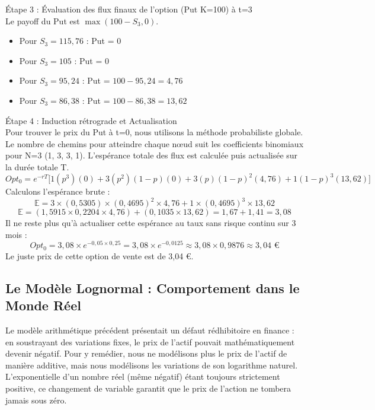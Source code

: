 \begin{examplebox}
Étape 3 : Évaluation des flux finaux de l'option (Put K=100) à t=3\\
Le payoff du Put est $\max(100 - S_3, 0)$.
\begin{itemize}[label=$\cdot$]
    \item Pour $S_3 = 115,76$ : Put = 0
    \item Pour $S_3 = 105$ : Put = 0
    \item Pour $S_3 = 95,24$ : Put = $100 - 95,24 = 4,76$
    \item Pour $S_3 = 86,38$ : Put = $100 - 86,38 = 13,62$
\end{itemize}

Étape 4 : Induction rétrograde et Actualisation\\
Pour trouver le prix du Put à t=0, nous utilisons la méthode probabiliste globale. Le nombre de chemins pour atteindre chaque nœud suit les coefficients binomiaux pour N=3 (1, 3, 3, 1). L'espérance totale des flux est calculée puis actualisée sur la durée totale T.
\begin{equation}
    \label{eq:fsec3-ex_opt_calc}
    Opt_0 = e^{-rT} \Big[ 1(p^3)(0) + 3(p^2)(1-p)(0) + 3(p)(1-p)^2(4,76) + 1(1-p)^3(13,62) \Big]
\end{equation}
Calculons l'espérance brute :
\begin{equation}
    \label{eq:fsec3-ex_esp_calc}
    \mathbb{E} = 3 \times (0,5305) \times (0,4695)^2 \times 4,76 + 1 \times (0,4695)^3 \times 13,62
\end{equation}
\begin{equation}
    \label{eq:fsec3-ex_esp_res}
    \mathbb{E} = (1,5915 \times 0,2204 \times 4,76) + (0,1035 \times 13,62) = 1,67 + 1,41 = 3,08
\end{equation}
Il ne reste plus qu'à actualiser cette espérance au taux sans risque continu sur 3 mois :
\begin{equation}
    \label{eq:fsec3-ex_opt_res}
    Opt_0 = 3,08 \times e^{-0,05 \times 0,25} = 3,08 \times e^{-0,0125} \approx 3,08 \times 0,9876 \approx 3,04 \text{ €}
\end{equation}
Le juste prix de cette option de vente est de 3,04 €.
\end{examplebox}

\subsection{Le Modèle Lognormal : Comportement dans le Monde Réel}

Le modèle arithmétique précédent présentait un défaut rédhibitoire en finance : en soustrayant des variations fixes, le prix de l'actif pouvait mathématiquement devenir négatif. Pour y remédier, nous ne modélisons plus le prix de l'actif de manière additive, mais nous modélisons les variations de son logarithme naturel. L'exponentielle d'un nombre réel (même négatif) étant toujours strictement positive, ce changement de variable garantit que le prix de l'action ne tombera jamais sous zéro.

